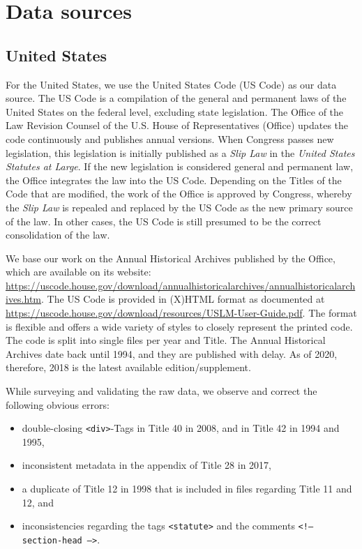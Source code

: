 
\section{Data sources}

\subsection{United States}

For the United States, 
we use the United States Code (US Code) as our data source. 
The US Code is a compilation of the general and permanent laws of the United States on the federal level, excluding state legislation.
The Office of the Law Revision Counsel of the U.S. House of Representatives (Office) updates the code continuously and publishes annual versions. 
When Congress passes new legislation, 
this legislation is initially published as a \emph{Slip Law} in the \emph{United States Statutes at Large}. 
If the new legislation is considered general and permanent law, the Office integrates the law into the US Code.
Depending on the Titles of the Code that are modified, 
the work of the Office is approved by Congress, 
whereby the \emph{Slip Law} is repealed and replaced by the US Code as the new primary source of the law. 
In other cases, the US Code is still presumed to be the correct consolidation of the law.

We base our work on the Annual Historical Archives published by the Office, 
which are available on its website:  \url{https://uscode.house.gov/download/annualhistoricalarchives/annualhistoricalarchives.htm}.\newline
The US Code is provided in (X)HTML format as documented at \url{https://uscode.house.gov/download/resources/USLM-User-Guide.pdf}. 
The format is flexible and offers a wide variety of styles to closely represent the printed code. 
The code is split into single files per year and Title.
The Annual Historical Archives date back until 1994, 
and they are published with delay. 
As of 2020, therefore, 2018 is the latest available edition/supplement.
 
While surveying and validating the raw data, we observe and correct the following obvious errors:
\begin{itemize}[itemsep=0em, parsep=0em, topsep=0em,label=--]
\item double-closing \texttt{<div>}-Tags in Title 40 in 2008, and in Title 42 in 1994 and 1995,
\item inconsistent metadata in the appendix of Title 28 in 2017,
\item a duplicate of Title 12 in 1998 that is included in files regarding Title 11 and 12, and
\item inconsistencies regarding the tags \texttt{<statute>} and the comments \texttt{<!-- \/section-head -->}. 
\end{itemize}

